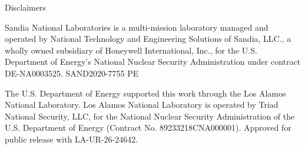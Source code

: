 \def\sandid{SAND2020-7755 PE}

\begin{frame}{Disclaimers}

\begin{block}{}\small
Sandia National Laboratories is a multi-mission laboratory managed and operated by National Technology and Engineering Solutions of Sandia, LLC., a wholly owned subsidiary of Honeywell International, Inc., for the U.S. Department of Energy’s National Nuclear Security Administration under contract DE-NA0003525.\newline
\sandid
\end{block}

\begin{block}{}
The U.S. Department of Energy supported this work through the Los Alamos National Laboratory. Los Alamos National Laboratory is operated by Triad National Security, LLC, for the National Nuclear Security Administration of the U.S. Department of Energy (Contract No. 89233218CNA000001). Approved for public release with LA-UR-26-24642. 
\end{block}

\end{frame}